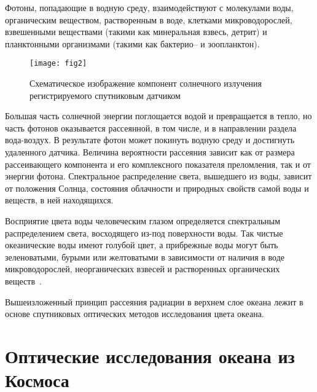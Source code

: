 Фотоны, попадающие в водную среду, взаимодействуют с молекулами воды, органическим веществом, растворенным в воде, клетками микроводорослей, взвешенными веществами (такими как минеральная взвесь, детрит) и планктонными организмами (такими как бактерио-- и зоопланктон).



\begin{figure}[!thb]
 \texttt{[image: fig2]}
 \caption{Схематическое изображение компонент солнечного излучения регистрируемого спутниковым датчиком}
 \label{fig:2} 
\end{figure}

Большая часть солнечной энергии поглощается водой и превращается в тепло, но часть фотонов оказывается рассеянной, в том числе, и в направлении раздела вода-воздух. В результате фотон может покинуть водную среду и достигнуть удаленного датчика. Величина вероятности рассеяния зависит как от размера рассеивающего компонента и его комплексного показателя преломления, так и от энергии фотона. Спектральное распределение света, вышедшего из воды, зависит от положения Солнца, состояния облачности и природных свойств самой воды и веществ, в ней находящихся.

Восприятие цвета воды человеческим глазом определяется спектральным распределением света, восходящего из-под поверхности воды. Так чистые океанические воды имеют голубой цвет, а прибрежные воды могут быть зеленоватыми, бурыми или желтоватыми в зависимости от наличия в воде микроводорослей, неорганических взвесей и растворенных органических веществ~\citep{Pozdnyakov2003}.

Вышеизложенный принцип рассеяния радиации в верхнем слое океана лежит в основе спутниковых оптических методов исследования цвета океана.



\newpage

\section{Оптические исследования океана из Космоса} \label{sec:1.2}


